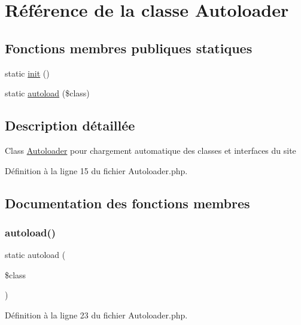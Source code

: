 \hypertarget{class_autoloader}{}\section{Référence de la classe Autoloader}
\label{class_autoloader}
\subsection*{Fonctions membres publiques statiques}
\begin{DoxyCompactItemize}
\item 
static \hyperlink{class_autoloader_a9f0be6ae273d3669e11c29910a0be338}{init} ()
\item 
static \hyperlink{class_autoloader_ab4c022bf9d3474583030f31894865182}{autoload} (\$class)
\end{DoxyCompactItemize}


\subsection{Description détaillée}
Class \hyperlink{class_autoloader}{Autoloader} pour chargement automatique des classes et interfaces du site 

Définition à la ligne 15 du fichier Autoloader.\+php.



\subsection{Documentation des fonctions membres}
\mbox{\label{class_autoloader_ab4c022bf9d3474583030f31894865182}} 
\subsubsection{\texorpdfstring{autoload()}{autoload()}}
{\footnotesize\ttfamily static autoload (\begin{DoxyParamCaption}\item[{}]{\$class }\end{DoxyParamCaption})\hspace{0.3cm}{\ttfamily [static]}}



Définition à la ligne 23 du fichier Autoloader.\+php.

\mbox{\label{class_autoloader_a9f0be6ae273d3669e11c29910a0be338}} 
